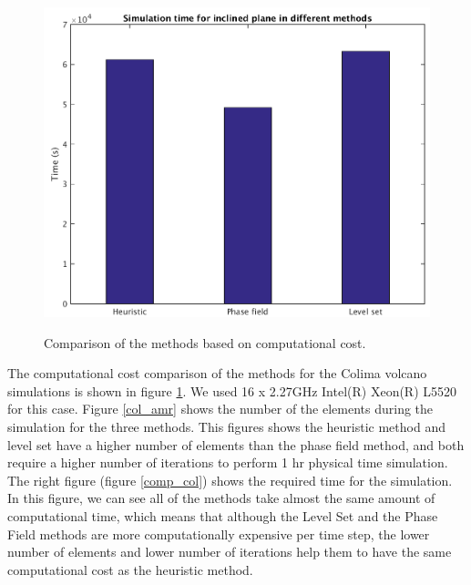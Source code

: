 \documentclass[review]{elsarticle}
\begin{document}
\begin{figure}[H]
\begin{minipage}[b]{.5\linewidth}
        \end{minipage}
        \begin{minipage}[b]{.5 \linewidth}
                \centering
                \includegraphics[width=1\textwidth]{IMAGES/colima_timing1.png}
                \label{comp_col}
        \end{minipage}
        \caption{Comparison of the methods based on computational cost.}
        \label{compinc}
\end{figure}

The computational cost comparison of the methods for the Colima volcano simulations is shown in figure \ref{compinc}. 
We used 16 x 2.27GHz Intel(R) Xeon(R) L5520 for this case. Figure \ref{col_amr} shows the number of the elements during the simulation for the three methods.  
This figures shows the heuristic method and level set have a higher number of elements than the phase field method, 
and both require a higher number of iterations to perform 1 hr physical time simulation. 
The right figure (figure \ref{comp_col}) shows the required time for the simulation. 
In this figure, we can see all of the methods take almost the same amount of computational time, which means that although the 
Level Set and the Phase Field methods are more computationally expensive per time step, the lower number of elements and lower
number of iterations help them to have the same computational cost as the heuristic method.  
\end{document}
